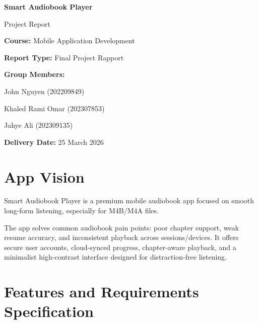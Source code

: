 \documentclass[11pt,a4paper]{article}
\begin{document}
\begin{titlepage}
    \centering
    \vspace*{2cm}
    
    {\Huge\bfseries Smart Audiobook Player\par}
    \vspace{0.5cm}
    {\Large Project Report\par}
    \vspace{2cm}
    
    {\large
    \textbf{Course:} Mobile Application Development\par
    \vspace{0.5cm}
    \textbf{Report Type:} Final Project Rapport\par
    \vspace{1cm}
    
    \textbf{Group Members:}\par
    \vspace{0.3cm}
    John Nguyen (202209849)\par
    Khaled Rami Omar (202307853)\par
    Jahye Ali (202309135)\par
    \vspace{1cm}
    
    \textbf{Delivery Date:} 25 March 2026\par
    }
    
    \vfill
\end{titlepage}

\tableofcontents
\clearpage

\section{App Vision}

Smart Audiobook Player is a premium mobile audiobook app focused on smooth long-form listening, especially for M4B/M4A files.

The app solves common audiobook pain points: poor chapter support, weak resume accuracy, and inconsistent playback across sessions/devices. It offers secure user accounts, cloud-synced progress, chapter-aware playback, and a minimalist high-contrast interface designed for distraction-free listening.

\section{Features and Requirements Specification}
\end{document}
